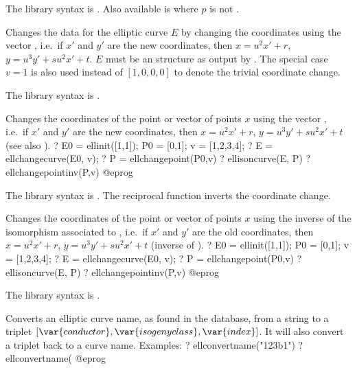 The library syntax is .
Also available is  where $p$ is not
.

\label{se:ellchangecurve}
Changes the data for the elliptic curve $E$
by changing the coordinates using the vector , i.e.~if $x'$
and $y'$ are the new coordinates, then $x=u^2x'+r$, $y=u^3y'+su^2x'+t$.
$E$ must be an  structure as output by . The special
case $v = 1$ is also used instead of $[1,0,0,0]$ to denote the
trivial coordinate change.

The library syntax is .

\label{se:ellchangepoint}
Changes the coordinates of the point or
vector of points $x$ using the vector , i.e.~if $x'$ and
$y'$ are the new coordinates, then $x=u^2x'+r$, $y=u^3y'+su^2x'+t$ (see also
).
\bprog
? E0 = ellinit([1,1]); P0 = [0,1]; v = [1,2,3,4];
? E = ellchangecurve(E0, v);
? P = ellchangepoint(P0,v)
? ellisoncurve(E, P)
? ellchangepointinv(P,v)
@eprog

The library syntax is .
The reciprocal function 
inverts the coordinate change.

\label{se:ellchangepointinv}
Changes the coordinates of the point or vector of points $x$ using
the inverse of the isomorphism associated to ,
i.e.~if $x'$ and $y'$ are the old coordinates, then $x=u^2x'+r$,
$y=u^3y'+su^2x'+t$ (inverse of ).
\bprog
? E0 = ellinit([1,1]); P0 = [0,1]; v = [1,2,3,4];
? E = ellchangecurve(E0, v);
? P = ellchangepoint(P0,v)
? ellisoncurve(E, P)
? ellchangepointinv(P,v)
@eprog

The library syntax is .

\label{se:ellconvertname}
Converts an elliptic curve name, as found in the  database,
from a string to a triplet $[\var{conductor}, \var{isogeny class},
\var{index}]$. It will also convert a triplet back to a curve name.
Examples:
\bprog
? ellconvertname("123b1")
? ellconvertname(%
@eprog

